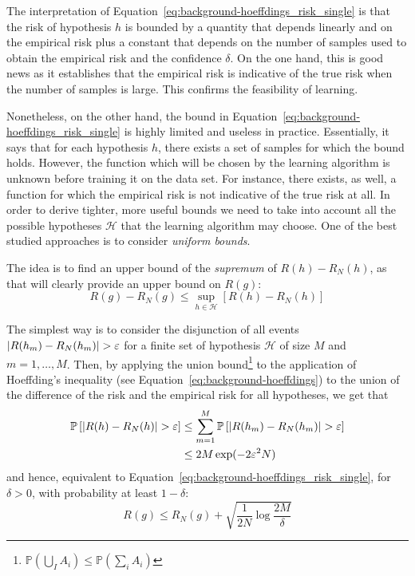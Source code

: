 {The interpretation of Equation~\ref{eq:background-hoeffdings_risk_single} is that the risk of hypothesis $h$ is bounded by a quantity that depends linearly and on the empirical risk plus a constant that depends on the number of samples used to obtain the empirical risk and the confidence $\delta$. On the one hand, this is good news as it establishes that the empirical risk is indicative of the true risk when the number of samples is large. This confirms the feasibility of learning. 

Nonetheless, on the other hand, the bound in Equation~\ref{eq:background-hoeffdings_risk_single} is highly limited and useless in practice. Essentially, it says that for each hypothesis $h$, there exists a set of samples for which the bound holds. However, the function which will be chosen by the learning algorithm is unknown before training it on the data set. For instance, there exists, as well, a function for which the empirical risk is not indicative of the true risk at all. In order to derive tighter, more useful bounds we need to take into account all the possible hypotheses $\mathcal{H}$ that the learning algorithm may choose. One of the best studied approaches is to consider \textit{uniform bounds}.

The idea is to find an upper bound of the \textit{supremum} of $R(h) - R_{N}(h)$, as that will clearly provide an upper bound on $R(g)$:
%
\begin{equation}
    R(g) - R_{N}(g) \leq \sup_{h \in \mathcal{H}} \left[ R(h) - R_{N}(h) \right]
\end{equation}

The simplest way is to consider the disjunction of all events $\lvert R(h_{m}) - R_{N}(h_{m})\rvert > \varepsilon$ for a finite set of hypothesis $\mathcal{H}$ of size $M$ and $m = 1, \ldots, M$. Then, by applying the union bound\footnote{$\mathbb{P}(\bigcup_{I}A_{i}) \leq \mathbb{P}(\sum_{i}A_{i})$} to the application of Hoeffding's inequality (see Equation~\ref{eq:background-hoeffdings}) to the union of the difference of the risk and the empirical risk for all hypotheses, we get that
%
\begin{equation}
\label{eq:background-uniform_bounds}
\begin{split}
    \mathbb{P} \left[ \left| R(h) - R_{N}(h) \right| > \varepsilon \right]& \leq \sum_{m=1}^{M} \mathbb{P} \left[ \lvert R(h_{m}) - R_{N}(h_{m})\rvert > \varepsilon \right]\\ 
                                                                            & \leq 2M \exp(-2\varepsilon^{2}N)
\end{split}
\end{equation}
%
and hence, equivalent to Equation~\ref{eq:background-hoeffdings_risk_single}, for $\delta > 0$,  with probability at least $1 - \delta$:
%
\begin{equation}
\label{eq:background-hoeffdings_risk_all}
    R(g) \leq R_{N}(g) + \sqrt{\frac{1}{2N}\log\frac{2M}{\delta}}
\end{equation}

}
